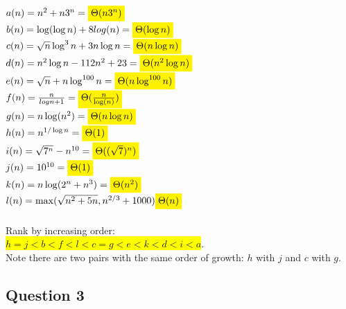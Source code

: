 \documentclass[12pt]{article}
\begin{document}
$a(n) = n^2 + n3^n = \colorbox{yellow}{$\Theta(n3^n)$}$\\
$b(n) = \log(\log n) + 8 log(n) = \colorbox{yellow}{$\Theta(\log n)$}$\\
$c(n) = \sqrt{n} \log^3n + 3n\log n = \colorbox{yellow}{$\Theta(n\log n)$}$\\
$d(n) = n^2\log n - 112 n^2 + 23 = \colorbox{yellow}{$\Theta(n^2 \log n)$}$\\
$e(n) = \sqrt{n} + n \log^{100} n = \colorbox{yellow}{$\Theta(n \log^{100} n)$}$\\
$f(n) = \frac{n}{log n + 1} = \colorbox{yellow}{$\Theta(\frac{n}{\log(n)})$}$\\
$g(n) = n \log (n^2) = \colorbox{yellow}{$\Theta(n\log n)$}$\\
$h(n) = n^{1/\log n} = \colorbox{yellow}{$\Theta(1)$}$\\
$i(n) = \sqrt{7^n} - n^{10}= \colorbox{yellow}{$\Theta((\sqrt{7})^{n})$}$\\
$j(n) = 10^{10} = \colorbox{yellow}{$\Theta(1)$}$\\
$k(n) = n \log(2^n + n^3) = \colorbox{yellow}{$\Theta(n^2)$}$\\
$l(n) = \max(\sqrt{n^2 + 5n}, n^{2/3} + 1000) \colorbox{yellow}{$\Theta(n)$}$\\
\\
Rank by increasing order:\\
\colorbox{yellow}{$h = j < b < f < l < c = g < e < k < d < i < a$}.\\
Note there are two pairs with the same order of growth: $h$ with $j$ and $c$ with $g$.
\par\null\par
\subsection*{Question 3}
\end{document}
